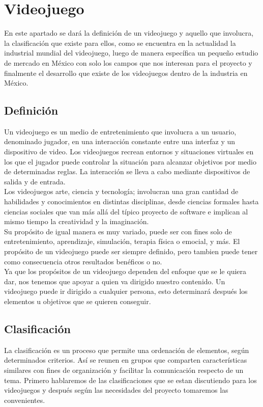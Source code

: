 \section{Videojuego}
En este apartado se dará la definición de un videojuego y aquello que involucra, la clasificación que existe para ellos, como se encuentra en la actualidad la industrial mundial del videojuego, luego de manera específica un pequeño estudio de mercado en México con solo los campos que nos interesan para el proyecto y finalmente el desarrollo que existe de los videojuegos dentro de la industria en México. 

\subsection{Definición}
Un videojuego es un medio de entretenimiento que involucra a un usuario, denominado jugador, en una interacción constante entre una interfaz y un dispositivo de video\cite[Morales Urrutia, 2010]{defVid}. Los videojuegos recrean	entornos y situaciones virtuales en los que el jugador puede controlar la situación para alcanzar objetivos por medio de determinadas reglas. La interacción se lleva a cabo mediante dispositivos de salida y de entrada.
\\[1pt]
		
Los videojuegos arte, ciencia y tecnología; involucran una gran cantidad de habilidades y conocimientos en distintas disciplinas, desde ciencias formales hasta ciencias sociales que van más allá del típico proyecto de software e implican al mismo tiempo la creatividad y la imaginación.
\\[1pt]

Su propósito de igual manera es muy variado, puede ser con fines solo de entretenimiento, aprendizaje, simulación, terapia física o emocial, y más. El propósito de un videojuego puede ser siempre definido, pero tambien puede tener como consecuencia otros resultados benéficos o no.
\\[1pt]

Ya que los propósitos de un videojuego dependen del enfoque que se le quiera dar, nos tenemos que apoyar a quien va dirigido nuestro contenido. Un videojuego puede ir dirigido a cualquier persona, esto determinará después los elementos u objetivos que se quieren conseguir.
\\[1pt]  
					
\subsection{Clasificación}
La clasificación es un proceso que permite una ordenación de elementos, según determinados criterios. Así se reunen en grupos que comparten características similares con fines de organización y facilitar la comunicación respecto de un tema. Primero hablaremos de las clasificaciones que se estan discutiendo para los videojuegos y después según las necesidades del proyecto tomaremos las convenientes. 
\\[1pt]

